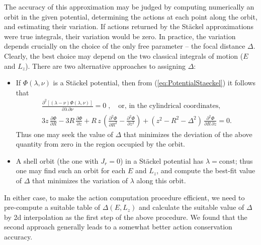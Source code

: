 \documentclass[12pt]{article}
\renewcommand{\d}{\partial}
\begin{document}
The accuracy of this approximation may be judged by computing numerically an orbit in the given potential, determining the actions at each point along the orbit, and estimating their variation. If actions returned by the St\"ackel approximations were true integrals, their variation would be zero. In practice, the variation depends crucially on the choice of the only free parameter -- the focal distance $\Delta$. Clearly, the best choice may depend on the two classical integrals of motion ($E$ and $L_z$). There are two alternative approaches to assigning $\Delta$:
\begin{itemize}
\item If $\Phi(\lambda,\nu)$ is a St\"ackel potential, then from (\ref{eq:PotentialStaeckel}) it follows that 
\begin{subequations}
\begin{align}
\frac{\d^2[(\lambda-\nu)\Phi(\lambda,\nu)]}{\d\lambda\,\d\nu} = 0\;,
\quad\mbox{or, in the cylindrical coordinates,} \\
3 z\, \frac{\d\Phi}{\d R} - 3 R\, \frac{\d\Phi}{\d z} +
R\,z\,\left(\frac{\d^2\Phi}{\d R^2} - \frac{\d^2\Phi}{\d z^2}\right) +
(z^2 - R^2 - \Delta^2)\,\frac{\d^2\Phi}{\d R\,\d z} = 0 .
\end{align}
\end{subequations}
Thus one may seek the value of $\Delta$ that minimizes the deviation of the above quantity from zero in the region occupied by the orbit.
\item A shell orbit (the one with $J_r=0$) in a St\"ackel potential has $\lambda=\mathrm{const}$; thus one may find such an orbit for each $E$ and $L_z$, and compute the best-fit value of $\Delta$ that minimizes the variation of $\lambda$ along this orbit.
\end{itemize}
In either case, to make the action computation procedure efficient, we need to pre-compute a suitable table of $\Delta(E,L_z)$ and calculate the suitable value of $\Delta$ by 2d interpolation as the first step of the above procedure.
We found that the second approach generally leads to a somewhat better action conservation accuracy.
\end{document}
